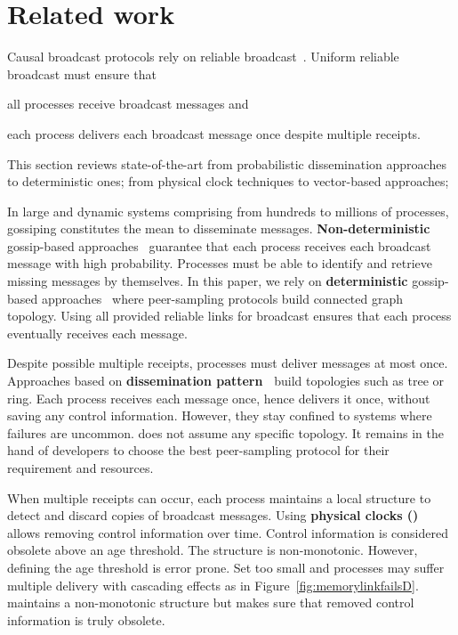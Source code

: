 
\section{Related work}
\label{sec:relatedwork}

Causal broadcast protocols rely on reliable
broadcast~\cite{hadzilacos1994modular}. Uniform reliable broadcast must ensure
that
\begin{inparaenum}[(i)]
\item all processes receive broadcast messages and
\item each process delivers each broadcast message once despite multiple
  receipts.
\end{inparaenum} This section reviews state-of-the-art from probabilistic
dissemination approaches to deterministic ones; from physical clock techniques
to vector-based approaches;

In large and dynamic systems comprising from hundreds to millions of processes,
gossiping constitutes the mean to disseminate
messages. \textbf{Non-deterministic} gossip-based
approaches~\cite{birman1999bimodal,demers1987epidemic} guarantee that each
process receives each broadcast message with high probability. Processes must be
able to identify and retrieve missing messages by themselves. In this paper, we
rely on \textbf{deterministic} gossip-based
approaches~\cite{friedman2004causal,nedelec2017adaptive} where peer-sampling
protocols build connected graph topology. Using all provided reliable links for
broadcast ensures that each process eventually receives each message.

Despite possible multiple receipts, processes must deliver messages at most
once. Approaches based on \textbf{dissemination
  pattern~\cite{bravo2017saturn,raynal2013distributed}} build topologies such as
tree or ring. Each process receives each message once, hence delivers it once,
without saving any control information. However, they stay confined to systems
where failures are uncommon. \RPCBROADCAST does not assume any specific
topology. It remains in the hand of developers to choose the best peer-sampling
protocol for their requirement and resources.

When multiple receipts can occur, each process maintains a local structure to
detect and discard copies of broadcast messages. Using \textbf{physical clocks
  (\REF)} allows removing control information over time. Control information is
considered obsolete above an age threshold. The structure is
non-monotonic. However, defining the age threshold is error prone. Set too small
and processes may suffer multiple delivery with cascading effects as in
Figure~\ref{fig:memorylinkfailsD}. 
\RPCBROADCAST maintains a non-monotonic structure but makes sure that removed
control information is truly obsolete.

